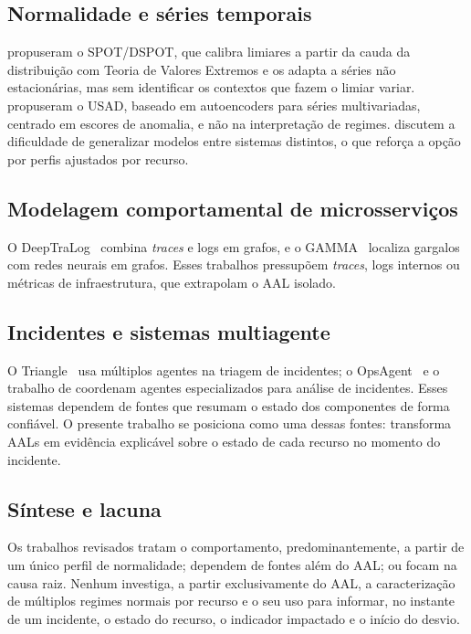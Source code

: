\documentclass[sigconf,nonacm]{acmart}
\begin{document}
\subsection{Normalidade e séries temporais}
\citet{siffer2017dspot} propuseram o SPOT/DSPOT, que calibra limiares a partir da cauda da distribuição com Teoria de Valores Extremos e os adapta a séries não estacionárias, mas sem identificar os contextos que fazem o limiar variar. \citet{audibert2020usad} propuseram o USAD, baseado em autoencoders para séries multivariadas, centrado em escores de anomalia, e não na interpretação de regimes. \citet{wang2025crosssystem} discutem a dificuldade de generalizar modelos entre sistemas distintos, o que reforça a opção por perfis ajustados por recurso.

\subsection{Modelagem comportamental de microsserviços}
O DeepTraLog~\citep{zhang2022deeptralog} combina \emph{traces} e logs em grafos, e o GAMMA~\citep{somashekar2024gamma} localiza gargalos com redes neurais em grafos. Esses trabalhos pressupõem \emph{traces}, logs internos ou métricas de infraestrutura, que extrapolam o AAL isolado.

\subsection{Incidentes e sistemas multiagente}
O Triangle~\citep{yu2025triangle} usa múltiplos agentes na triagem de incidentes; o OpsAgent~\citep{luo2025opsagent} e o trabalho de \citet{zhang2025isre} coordenam agentes especializados para análise de incidentes. Esses sistemas dependem de fontes que resumam o estado dos componentes de forma confiável. O presente trabalho se posiciona como uma dessas fontes: transforma AALs em evidência explicável sobre o estado de cada recurso no momento do incidente.

\subsection{Síntese e lacuna}
Os trabalhos revisados tratam o comportamento, predominantemente, a partir de um único perfil de normalidade; dependem de fontes além do AAL; ou focam na causa raiz. Nenhum investiga, a partir exclusivamente do AAL, a caracterização de múltiplos regimes normais por recurso e o seu uso para informar, no instante de um incidente, o estado do recurso, o indicador impactado e o início do desvio.
\end{document}
